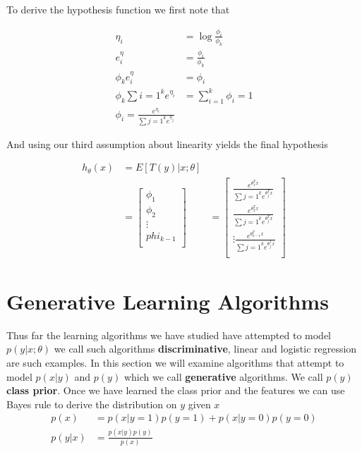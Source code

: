 \documentclass[11pt]{exam}
\begin{document}
To derive the hypothesis function we first note that 

\begin{align*}
\eta_i &= \log\frac{\phi_i}{\phi_k}\\
e^\eta_i &= \frac{\phi_i}{\phi_k}\\
\phi_ke^\eta_i &= \phi_i\\
\phi_k \sum{i=1}^k e^{\eta_i} &= \sum_{i=1}^k \phi_i = 1\\
\phi_i = \frac{e^{\eta_i}}{\sum{j=1}^k e^{\eta_j}}
\end{align*}

And using our third assumption about linearity yields the final hypothesis

\begin{align*}
h_\theta(x) &= E[T(y)|x;\theta]\\
            &= \begin{bmatrix}
             \phi_1\\
             \phi_2\\
             \vdots\\
             phi_{k-1}\\
            \end{bmatrix}
            &= \begin{bmatrix}
            \frac{e^{\theta_1^Tx}}{\sum{j=1}^k e^{\theta_j^Tx}}\\
            \frac{e^{\theta_2^Tx}}{\sum{j=1}^k e^{\theta_j^Tx}}\\
            \vdots
            \frac{e^{\theta_{k-1}^Tx}}{\sum{j=1}^k e^{\theta_j^Tx}}\\
            \end{bmatrix}
\end{align*}

\section{Generative Learning Algorithms}

Thus far the learning algorithms we have studied have attempted to model $p(y|x;\theta)$ we call such algorithms \textbf{discriminative}, linear and logistic regression are such examples. In this section we will examine algorithms that attempt to model $p(x|y)$ and $p(y)$ which we call \textbf{generative} algorithms. We call $p(y)$ \textbf{class prior}. Once we have learned the class prior and the features we can use Bayes rule to derive the distribution on $y$ given $x$
\begin{align*}
p(x) &= p(x|y=1)p(y=1) + p(x|y=0)p(y=0)\\ 
p(y|x) &= \frac{p(x|y)p(y)}{p(x)}\\
\end{align*}
\end{document}
